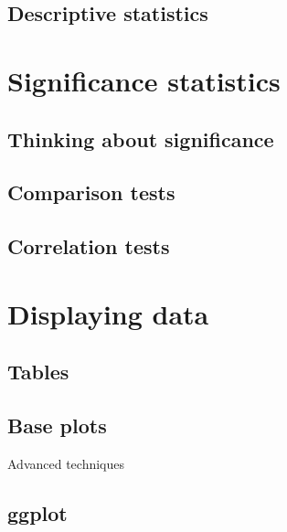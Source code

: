 \documentclass[
]{book}
\begin{document}
\hypertarget{descriptive-statistics}{%
\section{Descriptive statistics}\label{descriptive-statistics}}

\hypertarget{significance-statistics}{%
\chapter{Significance statistics}\label{significance-statistics}}

\hypertarget{thinking-about-significance}{%
\section{Thinking about significance}\label{thinking-about-significance}}

\hypertarget{comparison-tests}{%
\section{Comparison tests}\label{comparison-tests}}

\hypertarget{correlation-tests}{%
\section{Correlation tests}\label{correlation-tests}}

\hypertarget{displaying-data}{%
\chapter{Displaying data}\label{displaying-data}}

\hypertarget{tables}{%
\section{Tables}\label{tables}}

\hypertarget{base-plots-1}{%
\section{Base plots}\label{base-plots-1}}

Advanced techniques

\hypertarget{ggplot}{%
\section{ggplot}\label{ggplot}}
\end{document}

